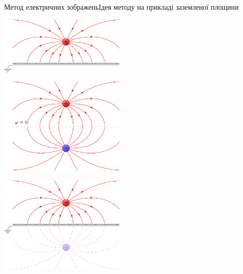 \documentclass{beamer}
\begin{document}
\begin{frame}{Метод електричних зображень}{Ідея методу на прикладі заземленої площини}
	\begin{overprint}
		\begin{center}
			\includegraphics[width=6cm]{charge_near_plane.pdf}
		\end{center}
		\begin{center}
			\includegraphics[width=6cm]{two_charges.pdf}
		\end{center}
		\begin{center}
			\includegraphics[width=6cm]{charge_image.pdf}
		\end{center}
	\end{overprint}
\end{frame}
\end{document}
